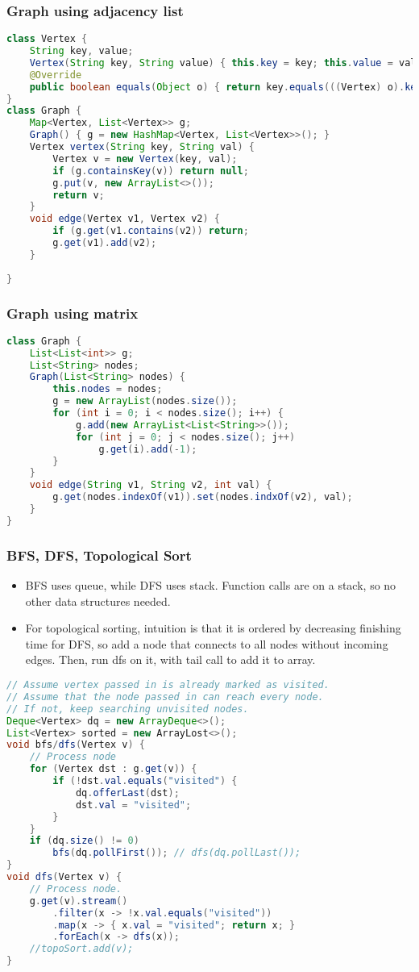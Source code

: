 \documentclass[10pt]{article}
\begin{document}
\subsubsection{Graph using adjacency list}
\begin{lstlisting}[language=java]
class Vertex {
    String key, value;
    Vertex(String key, String value) { this.key = key; this.value = value; }
    @Override
    public boolean equals(Object o) { return key.equals(((Vertex) o).key); }
}
class Graph {
    Map<Vertex, List<Vertex>> g;
    Graph() { g = new HashMap<Vertex, List<Vertex>>(); }
    Vertex vertex(String key, String val) {
        Vertex v = new Vertex(key, val);
        if (g.containsKey(v)) return null;
        g.put(v, new ArrayList<>());
        return v;
    }
    void edge(Vertex v1, Vertex v2) {
        if (g.get(v1.contains(v2)) return;
        g.get(v1).add(v2);
    }
    
}
\end{lstlisting}
\subsubsection{Graph using matrix}
\begin{lstlisting}[language=java]
class Graph {
    List<List<int>> g;
    List<String> nodes;
    Graph(List<String> nodes) {
        this.nodes = nodes;
        g = new ArrayList(nodes.size());
        for (int i = 0; i < nodes.size(); i++) {
            g.add(new ArrayList<List<String>>());
            for (int j = 0; j < nodes.size(); j++)
                g.get(i).add(-1);
        }
    }
    void edge(String v1, String v2, int val) {
        g.get(nodes.indexOf(v1)).set(nodes.indxOf(v2), val);
    }
}
\end{lstlisting}
\subsubsection{BFS, DFS, Topological Sort}
\begin{itemize}
    \item BFS uses queue, while DFS uses stack. Function calls are on a stack, so no other data structures needed.
    \item For topological sorting, intuition is that it is ordered by decreasing finishing time for DFS, so add a node that connects to all nodes without incoming edges. Then, run dfs on it, with tail call to add it to array.
\end{itemize}
\begin{lstlisting}[language=java]
// Assume vertex passed in is already marked as visited.
// Assume that the node passed in can reach every node.
// If not, keep searching unvisited nodes.
Deque<Vertex> dq = new ArrayDeque<>();
List<Vertex> sorted = new ArrayLost<>();
void bfs/dfs(Vertex v) {
    // Process node
    for (Vertex dst : g.get(v)) {
        if (!dst.val.equals("visited") {
            dq.offerLast(dst);
            dst.val = "visited";
        }
    }
    if (dq.size() != 0)
        bfs(dq.pollFirst()); // dfs(dq.pollLast());
}
void dfs(Vertex v) {
    // Process node.
    g.get(v).stream()
        .filter(x -> !x.val.equals("visited"))
        .map(x -> { x.val = "visited"; return x; }
        .forEach(x -> dfs(x));
    //topoSort.add(v);
}
\end{lstlisting}
\end{document}
